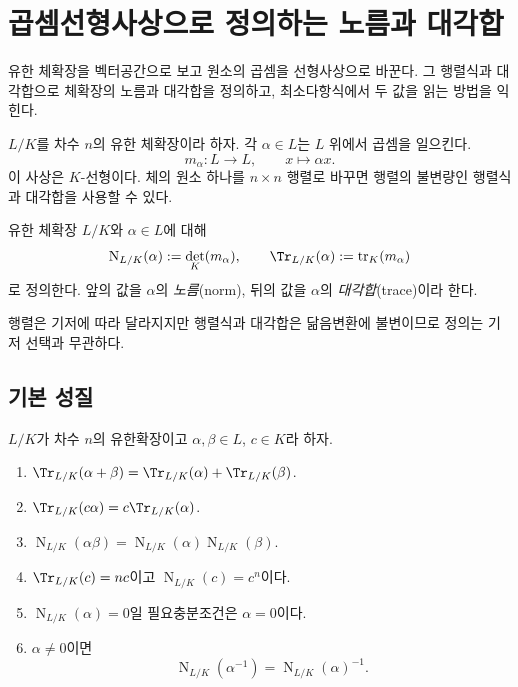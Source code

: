 \clearpage
\section{곱셈선형사상으로 정의하는 노름과 대각합}
\label{sec:multiplication-norm-trace}

\begin{learninggoal}
유한 체확장을 벡터공간으로 보고 원소의 곱셈을 선형사상으로 바꾼다. 그 행렬식과 대각합으로 체확장의 노름과 대각합을 정의하고, 최소다항식에서 두 값을 읽는 방법을 익힌다.
\end{learninggoal}

$L/K$를 차수 $n$의 유한 체확장이라 하자. 각 $\alpha\in L$는 $L$ 위에서 곱셈을 일으킨다.
\[
  m_\alpha:L\longrightarrow L,
  \qquad x\longmapsto\alpha x.
\]
이 사상은 $K$-선형이다. 체의 원소 하나를 $n\times n$ 행렬로 바꾸면 행렬의 불변량인 행렬식과 대각합을 사용할 수 있다.

\begin{definition}
\label{def:norm-trace}
유한 체확장 $L/K$와 $\alpha\in L$에 대해
\[
  \operatorname N_{L/K}(\alpha):=\det_K(m_\alpha),
  \qquad
  \Tr_{L/K}(\alpha):=\operatorname{tr}_K(m_\alpha)
\]
로 정의한다. 앞의 값을 $\alpha$의 \emph{노름}(norm), 뒤의 값을 $\alpha$의 \emph{대각합}(trace)이라 한다.
\end{definition}

행렬은 기저에 따라 달라지지만 행렬식과 대각합은 닮음변환에 불변이므로 정의는 기저 선택과 무관하다.

\subsection{기본 성질}

\begin{proposition}
\label{prop:norm-trace-basic-properties}
$L/K$가 차수 $n$의 유한확장이고 $\alpha,\beta\in L$, $c\in K$라 하자.
\begin{enumerate}[label=(\roman*)]
  \item $\Tr_{L/K}(\alpha+\beta)=\Tr_{L/K}(\alpha)+\Tr_{L/K}(\beta)$.
  \item $\Tr_{L/K}(c\alpha)=c\Tr_{L/K}(\alpha)$.
  \item $\operatorname N_{L/K}(\alpha\beta)
  =\operatorname N_{L/K}(\alpha)\operatorname N_{L/K}(\beta)$.
  \item $\Tr_{L/K}(c)=nc$이고 $\operatorname N_{L/K}(c)=c^n$이다.
  \item $\operatorname N_{L/K}(\alpha)=0$일 필요충분조건은 $\alpha=0$이다.
  \item $\alpha\ne0$이면
  \[
    \operatorname N_{L/K}(\alpha^{-1})
    =\operatorname N_{L/K}(\alpha)^{-1}.
  \]
\end{enumerate}
\end{proposition}

